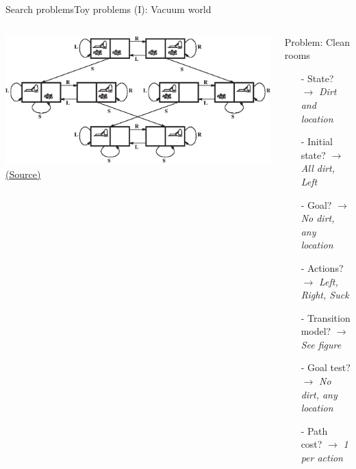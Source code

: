 \documentclass[10pt,compress]{beamer} %
\begin{document}
\begin{frame}[fragile]{Search problems}{Toy problems (I): Vacuum world}
       \begin{columns}
	           \centering 
               \includegraphics[width=\linewidth]{figs/vacuum2-state-space.eps}\\
	           \tiny{\href{http://aima.cs.berkeley.edu/index.html}{(Source)}}

                \begin{exampleblock}{Problem: Clean rooms}
                    \begin{itemize}
                    \item[-] State? $\rightarrow$ \textit{Dirt and location}
                    \item[-] Initial state? $\rightarrow$ \textit{All dirt, Left}
                    \item[-] Goal? $\rightarrow$ \textit{No dirt, any location}
                    \item[-] Actions? $\rightarrow$ \textit{Left, Right, Suck}
                    \item[-] Transition model? $\rightarrow$ \textit{See figure}
                    \item[-] Goal test? $\rightarrow$ \textit{No dirt, any location}
                    \item[-] Path cost? $\rightarrow$ \textit{1 per action}
                    \end{itemize}
                \end{exampleblock}
      \end{columns}
\end{frame}
\end{document}
